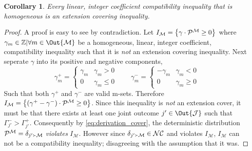 \documentclass[aps, 10pt, english, twoside, pra, nofootinbib, longbibliography]{revtex4-1}
\theoremstyle{plain}
\newtheorem{corollary}[theorem]{Corollary}
\theoremstyle{definition}
\theoremstyle{remark}
\newcommand{\res}{\mathrel{\Yright}}
\newcommand{\mscenario}{\mathcal{M}}
\newcommand{\jointvar}{\mathcal{J}}
\newcommand{\mset}[1]{\gamma^{#1}}
\newcommand{\supp}[1]{\si\br{#1}}
\begin{document}
    \begin{corollary}
        \label{cor:linear_integer}
        Every linear, integer coefficient compatibility inequality that is homogeneous is an extension covering inequality.
    \end{corollary}
    \begin{proof}
        A proof is easy to see by contradiction. Let $I_{\mscenario} = \bc{\gamma \cdot \probvec^{\mscenario} \geq 0}$ where $\gamma_m \in \Z | \forall m \in \Out{\mscenario}$ be a homogeneous, linear, integer coefficient, compatibility inequality such that it is \textit{not} an extension covering inequality. Next seperate $\gamma$ into its positive and negative components,
        \[ \gamma_m^{+} = \begin{cases}
            \gamma_m & \gamma_m > 0 \\
            0 & \gamma_m \leq 0
        \end{cases}
        \qquad
        \gamma_m^{-} = \begin{cases}
            -\gamma_m & \gamma_m < 0 \\
            0 & \gamma_m \geq 0
        \end{cases} \]
        Such that both $\gamma^{+}$ and $\gamma^{-}$ are valid m-sets. Therefore $I_{\mscenario} = \bc{\br{\gamma^{+} - \gamma^{-}} \cdot \probvec^{\mscenario} \geq 0}$. Since this inequality is \textit{not} an extension cover, it must be that there exists at least one joint outcome $j' \in \Out{\jointvar}$ such that $\Gamma^{-}_{j'} > \Gamma^{+}_{j'}$. Consequently by \cref{eq:derivation_cover}, the deterministic distribution $\probvec^{\mscenario} = \de_{j' \res \mscenario}$ \textit{violates} $I_{\mscenario}$. However since $\de_{j' \res \mscenario} \in \mathcal{NC}$ and violates $I_{\mscenario}$, $I_{\mscenario}$ can not be a compatibility inequality; disagreeing with the assumption that it was.
    \end{proof}
\end{document}
